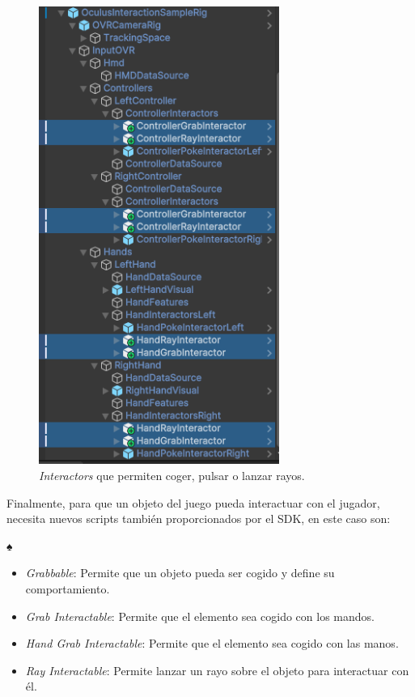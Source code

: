 \begin{figure}
	\centering
	\includegraphics[width=0.7\textwidth]{04.Desarrollo/05.Entrega5/01.Iteracion5_1/00.Figuras/06.interactors.png}
	\caption{\textit{Interactors} que permiten coger, pulsar o lanzar rayos.}
	\label{fig:interactors}
\end{figure}

Finalmente, para que un objeto del juego pueda interactuar con el jugador, necesita nuevos scripts también proporcionados por el SDK, en este caso son: 

♠\begin{itemize}
	\item {\textit{Grabbable}: Permite que un objeto pueda ser cogido y define su comportamiento.}
	\item{\textit{Grab Interactable}: Permite que el elemento sea cogido con los mandos.}
	\item{\textit{Hand Grab Interactable}: Permite que el elemento sea cogido con las manos.}
	\item{\textit{Ray Interactable}: Permite lanzar un rayo sobre el objeto para interactuar con él.}
\end{itemize}



